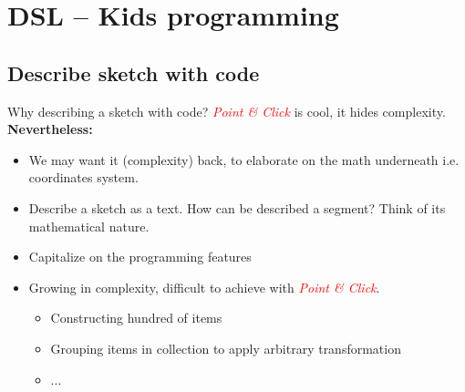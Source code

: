 \documentclass{beamer}
\begin{document}
\section{DSL -- Kids programming}
\subsection{Describe sketch with code}
\begin{frame}{Why describing a sketch with code?}
  \textcolor{red}{\emph{Point \& Click}} is cool, it hides complexity.\\
  \textbf{Nevertheless:}
  \begin{itemize}
  \item We may want it (complexity) back, to elaborate on the math
    underneath i.e. coordinates system.
  \item Describe a sketch as a text. How can be described a segment?
    Think of its mathematical nature.
  \item Capitalize on the programming features
  \item Growing in complexity, difficult to achieve with
    \textcolor{red}{\emph{Point \& Click}}.
    \begin{itemize}
    \item Constructing hundred of items
    \item Grouping items in collection to apply arbitrary transformation
    \item ...
    \end{itemize}
  \end{itemize}
\end{frame}
%
\end{document}
